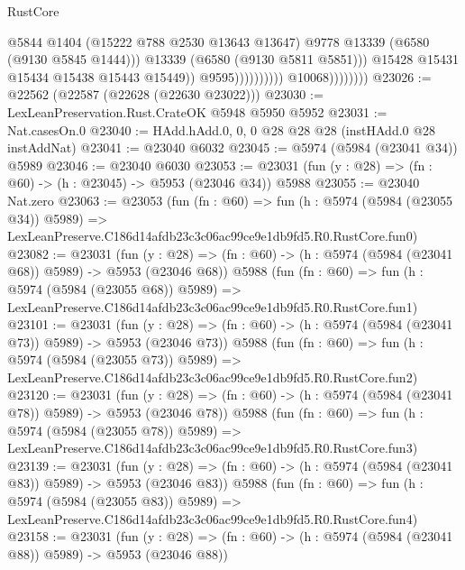 \begin{lexlean}{RustCore}
\begin{coremodule}
                                                @5844
                                                @1404
                                                (@15222 @788 @2530 @13643 @13647)
                                                @9778
                                                @13339
                                                (@6580 (@9130 @5845 @1444)))
                                              @13339
                                              (@6580 (@9130 @5811 @5851)))
                                            @15428
                                            @15431
                                            @15434
                                            @15438
                                            @15443
                                            @15449))
                                        @9595))))))))))
                    @10068))))))))
@23026 := @22562 (@22587 (@22628 (@22630 @23022)))
@23030 := LexLeanPreservation.Rust.CrateOK @5948 @5950 @5952
@23031 := Nat.casesOn.{0}
@23040 := HAdd.hAdd.{0, 0, 0} @28 @28 @28 (instHAdd.{0} @28 instAddNat)
@23041 := @23040 @6032
@23045 := @5974 (@5984 (@23041 @34)) @5989
@23046 := @23040 @6030
@23053 := @23031 (fun (y : @28) => (fn : @60) -> (h : @23045) -> @5953 (@23046 @34)) @5988
@23055 := @23040 Nat.zero
@23063 := @23053
    (fun (fn : @60) =>
    fun (h : @5974 (@5984 (@23055 @34)) @5989) =>
    LexLeanPreserve.C186d14afdb23c3c06ac99ce9e1db9fd5.R0.RustCore.fun0)
@23082 := @23031
    (fun (y : @28) => (fn : @60) -> (h : @5974 (@5984 (@23041 @68)) @5989) -> @5953 (@23046 @68))
    @5988
    (fun (fn : @60) =>
    fun (h : @5974 (@5984 (@23055 @68)) @5989) =>
    LexLeanPreserve.C186d14afdb23c3c06ac99ce9e1db9fd5.R0.RustCore.fun1)
@23101 := @23031
    (fun (y : @28) => (fn : @60) -> (h : @5974 (@5984 (@23041 @73)) @5989) -> @5953 (@23046 @73))
    @5988
    (fun (fn : @60) =>
    fun (h : @5974 (@5984 (@23055 @73)) @5989) =>
    LexLeanPreserve.C186d14afdb23c3c06ac99ce9e1db9fd5.R0.RustCore.fun2)
@23120 := @23031
    (fun (y : @28) => (fn : @60) -> (h : @5974 (@5984 (@23041 @78)) @5989) -> @5953 (@23046 @78))
    @5988
    (fun (fn : @60) =>
    fun (h : @5974 (@5984 (@23055 @78)) @5989) =>
    LexLeanPreserve.C186d14afdb23c3c06ac99ce9e1db9fd5.R0.RustCore.fun3)
@23139 := @23031
    (fun (y : @28) => (fn : @60) -> (h : @5974 (@5984 (@23041 @83)) @5989) -> @5953 (@23046 @83))
    @5988
    (fun (fn : @60) =>
    fun (h : @5974 (@5984 (@23055 @83)) @5989) =>
    LexLeanPreserve.C186d14afdb23c3c06ac99ce9e1db9fd5.R0.RustCore.fun4)
@23158 := @23031
    (fun (y : @28) => (fn : @60) -> (h : @5974 (@5984 (@23041 @88)) @5989) -> @5953 (@23046 @88))

\end{coremodule}
\end{lexlean}
